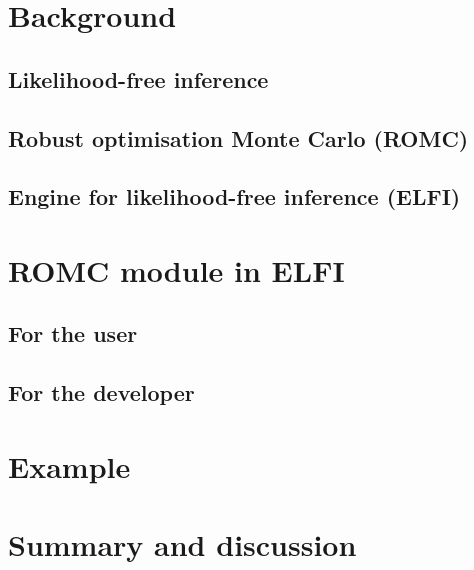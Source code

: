 \documentclass[article]{jss}
\begin{document}
\section{Background}

\subsection{Likelihood-free inference}


\subsection{Robust optimisation Monte Carlo (ROMC)}

\subsection{Engine for likelihood-free inference (ELFI)}

\section{ROMC module in ELFI}  %

\subsection{For the user}

\subsection{For the developer}

\section{Example}


\section{Summary and discussion} \label{sec:summary}
\end{document}

